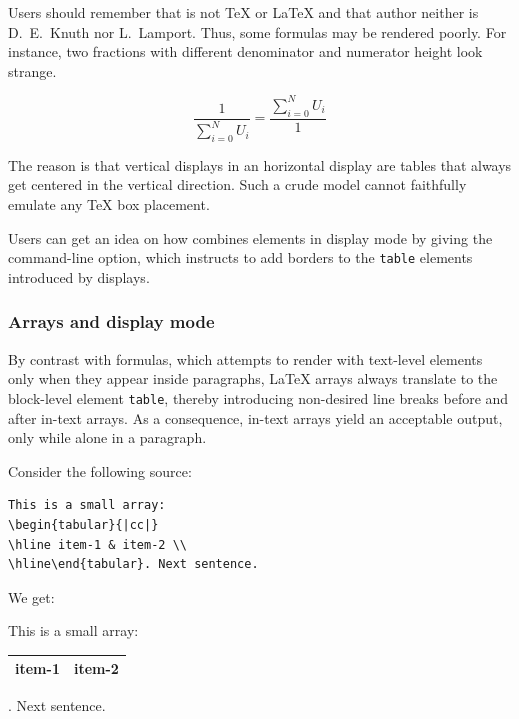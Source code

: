 Users should remember that \hevea{} is not \TeX{} or \LaTeX{} and that
\hevea{} author neither is D.~E.~Knuth nor L.~Lamport.
Thus, some formulas may be rendered poorly.
For instance, two fractions with different denominator and numerator
height look strange.
\begin{htmlonly}
$$
\frac{1}{\sum_{i=0}^{N}U_i} = \frac{\sum_{i=0}^{N}U_i}{1}
$$
\end{htmlonly}
\begin{center}
\end{center}
The reason is that vertical displays in an horizontal display are
\html{} tables
that always get centered in the vertical direction.
Such a crude model cannot  faithfully emulate any \TeX{} box placement.

Users can get an idea on how \hevea{} combines elements in display mode
by giving the   command-line option, which
instructs \hevea{} to add
borders to the \verb+table+ elements introduced by displays.

\subsubsection{Arrays and display mode}

By contrast with formulas, which \hevea{} attempts to render with
text-level elements only when they appear inside paragraphs, \LaTeX{} arrays
always translate to the
block-level element \verb+table+, thereby introducing non-desired line
breaks before and after in-text arrays.
As a consequence, in-text arrays yield an acceptable output, only while
alone in a paragraph.

\begin{htmlonly}
Consider the following source:
\begin{verbatim}
This is a small array:
\begin{tabular}{|cc|}
\hline item-1 & item-2 \\
\hline\end{tabular}. Next sentence.
\end{verbatim}
We get:
\begin{htmlout}
This is a small array:
\begin{tabular}{|cc|}\hline item-1 & item-2
\\ \hline\end{tabular}. Next sentence.
\end{htmlout}
\end{htmlonly}


